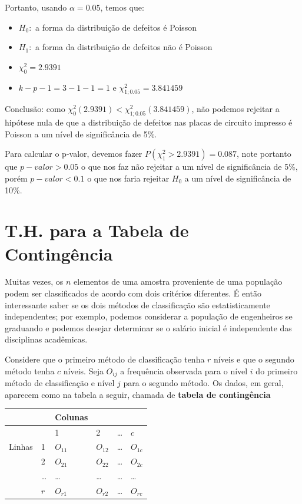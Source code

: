 \documentclass[
]{book}
\providecommand{\tightlist}{%
  \setlength{\itemsep}{0pt}\setlength{\parskip}{0pt}}
\begin{document}
Portanto, usando \(\alpha=0.05\), temos que:

\begin{itemize}
\tightlist
\item
  \(H_0:\) a forma da distribuição de defeitos é Poisson
\item
  \(H_1:\) a forma da distribuição de defeitos não é Poisson
\item
  \(\chi^2_0=2.9391\)
\item
  \(k-p-1=3-1-1=1\) e \(\chi^2_{1;0.05}=3.841459\)
\end{itemize}

Conclusão: como \(\chi^2_0(2.9391)<\chi^2_{1;0.05}(3.841459)\), não podemos rejeitar a hipótese nula de que a distribuição de defeitos nas placas de circuito impresso é Poisson a um nível de significância de 5\%.

Para calcular o p-valor, devemos fazer \(P(\chi_1^2>2.9391)=0.087\), note portanto que \(p-valor>0.05\) o que nos faz não rejeitar a um nível de significância de 5\%, porém \(p-valor<0.1\) o que nos faria rejeitar \(H_0\) a um nível de significância de 10\%.

\hypertarget{t.h.-para-a-tabela-de-continguxeancia}{%
\section{T.H. para a Tabela de Contingência}\label{t.h.-para-a-tabela-de-continguxeancia}}

Muitas vezes, os \(n\) elementos de uma amostra proveniente de uma população podem ser classificados de acordo com dois critérios diferentes. É então interessante saber se os dois métodos de classificação são estatisticamente independentes; por exemplo, podemos considerar a população de engenheiros se graduando e podemos desejar determinar se o salário inicial é independente das disciplinas acadêmicas.

Considere que o primeiro método de classificação tenha \(r\) níveis e que o segundo método tenha \(c\) níveis. Seja \(O_{ij}\) a frequência observada para o nível \(i\) do primeiro método de classificação e nível \(j\) para o segundo método. Os dados, em geral, aparecem como na tabela a seguir, chamada de \textbf{tabela de contingência}

\begin{longtable}[]{@{}llllll@{}}
\toprule
& & Colunas & & & \\
\midrule
\endhead
& & 1 & 2 & \ldots{} & \(c\) \\
Linhas & 1 & \(O_{11}\) & \(O_{12}\) & \ldots{} & \(O_{1c}\) \\
& 2 & \(O_{21}\) & \(O_{22}\) & \ldots{} & \(O_{2c}\) \\
& \ldots{} & \ldots{} & \ldots{} & \ldots{} & \ldots{} \\
& \(r\) & \(O_{r1}\) & \(O_{r2}\) & \ldots{} & \(O_{rc}\) \\
\bottomrule
\end{longtable}
\end{document}
